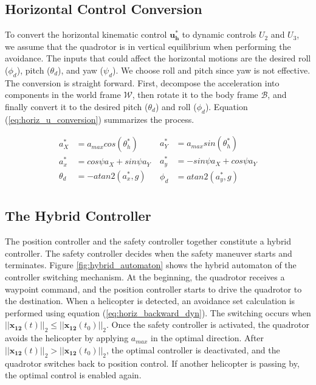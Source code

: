 \documentclass[journal,11pt,onecolumn,draftclsnofoot,]{IEEEtran}
\begin{document}
\subsection{Horizontal Control Conversion}
To convert the horizontal kinematic control $\boldsymbol{u_h^*}$ to dynamic controls $U_2$ and $U_3$, we assume that the quadrotor is in vertical equilibrium when performing the avoidance. The inputs that could affect the horizontal motions are the desired roll ($\phi_d$), pitch ($\theta_d$), and yaw ($\psi_d$). We choose roll and pitch since yaw is not effective. The conversion is straight forward. First, decompose the acceleration into components in the world frame $\mathcal{W}$, then rotate it to the body frame $\mathcal{B}$, and finally convert it to the desired pitch ($\theta_d$) and roll ($\phi_d$). Equation (\ref{eq:horiz_u_conversion}) summarizes the process. 

\begin{equation}
\label{eq:horiz_u_conversion}
\begin{aligned}
a_X^* &= a_{max}cos(\theta_h^*) \\
a_x^* &= cos\psi a_X + sin\psi a_Y \;\\
\theta_d &= -atan2(a_x^*,g) \\
\end{aligned}
\begin{aligned}
a_Y^* &= a_{max}sin(\theta_h^*) \\
a_y^* &= -sin\psi a_X + cos\psi a_Y \\
\phi_d &= atan2(a_y^*,g) \\
\end{aligned}
\end{equation}

\subsection{\textbf{The Hybrid Controller}}

The position controller and the safety controller together constitute a hybrid controller. The safety controller decides when the safety maneuver starts and terminates. Figure \ref{fig:hybrid_automaton} shows the hybrid automaton of the controller switching mechanism. At the beginning, the quadrotor receives a waypoint command, and the position controller starts to drive the quadrotor to the destination. When a helicopter is detected, an avoidance set calculation is performed using equation (\ref{eq:horiz_backward_dyn}). The switching occurs when $||\boldsymbol{x_{12}}(t)||_2 \le ||\boldsymbol{x_{12}}(t_0)||_2$. Once the safety controller is activated, the quadrotor avoids the helicopter by applying $a_{max}$ in the optimal direction. After $||\boldsymbol{x_{12}}(t)||_2 > ||\boldsymbol{x_{12}}(t_0)||_2$, the optimal controller is deactivated, and the quadrotor switches back to position control. If another helicopter is passing by, the optimal control is enabled again.
\end{document}
